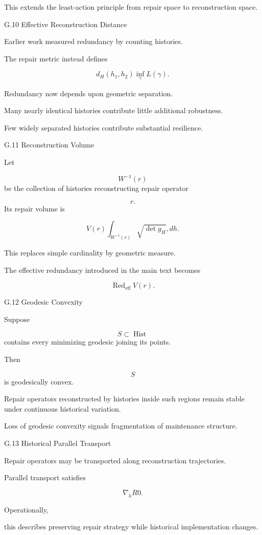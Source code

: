 \documentclass[12pt,oneside]{article}
\theoremstyle{plain}
\theoremstyle{definition}
\theoremstyle{remark}
\DeclareMathOperator{\Hist}{Hist}
\begin{document}
This extends the least-action principle from repair space to reconstruction space.


G.10 Effective Reconstruction Distance

Earlier work measured redundancy by counting histories.

The repair metric instead defines

\[
d_H(h_1,h_2)
\inf_\gamma
L(\gamma).
\]

Redundancy now depends upon geometric separation.

Many nearly identical histories contribute little additional robustness.

Few widely separated histories contribute substantial resilience.


G.11 Reconstruction Volume

Let

\[
W^{-1}(r)
\]
be the collection of histories reconstructing repair operator

\[
r.
\]
Its repair volume is

\[
V(r)
\int_{W^{-1}(r)}
\sqrt{\det g_H}
,dh.
\]

This replaces simple cardinality by geometric measure.

The effective redundancy introduced in the main text becomes

\[
\operatorname{Red}_{\mathrm{eff}}
V(r).
\]


G.12 Geodesic Convexity

Suppose

\[
S
\subset
\Hist
\]
contains every minimizing geodesic joining its points.

Then

\[
S
\]
is geodesically convex.

Repair operators reconstructed by histories inside such regions remain stable under continuous historical variation.

Loss of geodesic convexity signals fragmentation of maintenance structure.


G.13 Historical Parallel Transport

Repair operators may be transported along reconstruction trajectories.

Parallel transport satisfies

\[
\nabla_{\dot h}R
0. 

\]

Operationally,

this describes preserving repair strategy while historical implementation changes.
\end{document}
